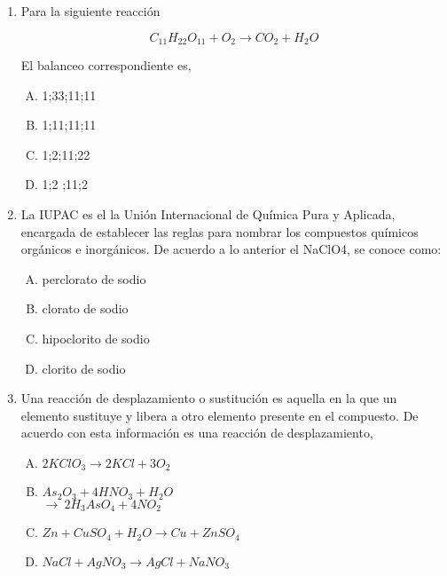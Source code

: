 \begin{enumerate}

\item  Para la siguiente reacción  \label{jenn-13}

\begin{equation*}
C_{11}H_{22}O_{11}+O_{2}\longrightarrow CO_{2}+H_{2}O
\end{equation*}

El balanceo correspondiente es,
\begin{enumerate}[(A)]
\item   1;33;11;11
\item 1;11;11;11
\item 1;2;11;22
\item 1;2 ;11;2
\end{enumerate}




\item   La IUPAC es el la Unión Internacional de Química Pura y Aplicada, encargada de establecer las reglas para nombrar los compuestos químicos orgánicos e inorgánicos. De acuerdo a lo anterior el NaClO4, se conoce como:\label{jenn-14}


\begin{enumerate}[(A)]
\item   perclorato de sodio
\item clorato de sodio
\item hipoclorito de sodio
\item clorito de sodio
\end{enumerate}




\item Una reacción de desplazamiento o sustitución es aquella en la que un elemento sustituye y libera a otro elemento presente en el compuesto. De acuerdo con esta información es una reacción de desplazamiento,  \label{jenn-15}


\begin{enumerate}[(A)]
\item $2KClO_{3}\longrightarrow 2KCl + 3O_{2}$
\item $As_{2}O_{3}+4HNO_{3}+H_{2}O$\\ 
 $\longrightarrow\ 2H_{3}AsO_{4}+4NO_{2}$\hfill
\item $Zn + CuSO_{4}+H_{2}O\longrightarrow Cu + ZnSO_{4}$
\item $NaCl+AgNO_{3}\longrightarrow AgCl + NaNO_{3}$
\end{enumerate}



\end{enumerate}
